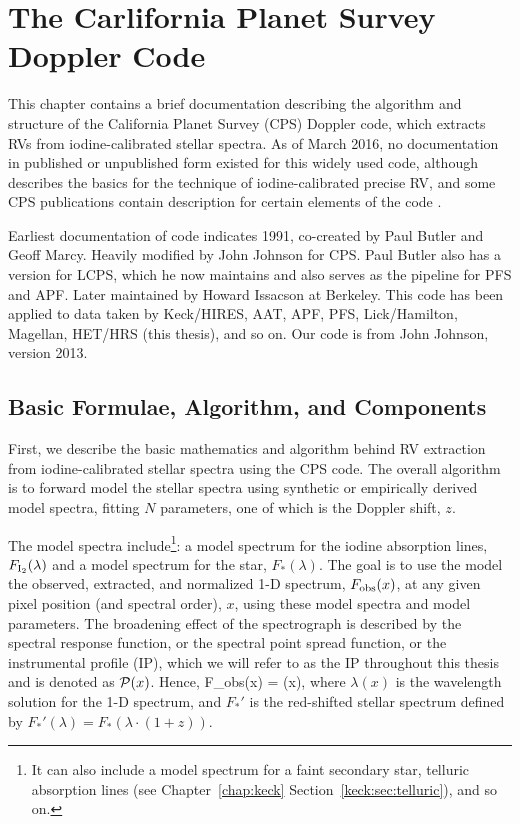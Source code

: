 \chapter{The Carlifornia Planet Survey Doppler Code}\label{chap:doppler}

This chapter contains a brief documentation describing the algorithm
and structure of the California Planet Survey (CPS) Doppler code,
which extracts RVs from iodine-calibrated stellar spectra. As of March
2016, no documentation in published or unpublished form existed for
this widely used code, although \cite{butler1996} describes the basics
for the technique of iodine-calibrated precise RV, and some CPS
publications contain description for certain elements of the code
\citep[e.g.,][]{ 2009ApJ...696...75H, 2011ApJ...726...73H,
  2011ApJS..197...26J}.

Earliest documentation of code indicates 1991, co-created by Paul
Butler and Geoff Marcy. Heavily modified by John Johnson for CPS. Paul
Butler also has a version for LCPS, which he now maintains and also
serves as the pipeline for PFS and APF. Later maintained by Howard
Issacson at Berkeley. This code has been applied to data taken by
Keck/HIRES, AAT, APF, PFS, Lick/Hamilton, Magellan, HET/HRS (this
thesis), and so on. Our code is from John Johnson, version 2013.


\section{Basic Formulae, Algorithm, and Components}

First, we describe the basic mathematics and algorithm behind RV
extraction from iodine-calibrated stellar spectra using the CPS
code. The overall algorithm is to forward model the stellar spectra
using synthetic or empirically derived model spectra, fitting $N$
parameters, one of which is the Doppler shift, $z$.

The model spectra include\footnote{It can also include a model
  spectrum for a faint secondary star, telluric absorption lines (see
  Chapter~\ref{chap:keck} Section~\ref{keck:sec:telluric}), and so
  on.}: a model spectrum for the iodine absorption lines, $F_{\rm
  I_2}(\lambda)$ and a model spectrum for the star,
$F_{*}(\lambda)$. The goal is to use the model the observed,
extracted, and normalized 1-D spectrum, $F_{\rm obs}(x)$, at any given
pixel position (and spectral order), $x$, using these model spectra
and model parameters. The broadening effect of the spectrograph is
described by the spectral response function, or the spectral point
spread function, or the instrumental profile (IP), which we will refer
to as the IP throughout this thesis and is denoted as
$\mathcal{P}(x)$. Hence,
\beq
F_{\rm obs}(x) =  \ast \curlyp(x),
\eeq
where $\lambda(x)$ is the wavelength solution for the 1-D spectrum,
and $F_{*}'$ is the red-shifted stellar spectrum defined by
$F_{*}'(\lambda) = F_{*}(\lambda\cdot(1+z))$. 




